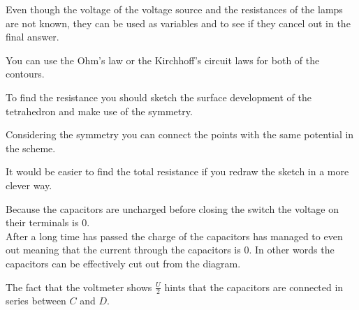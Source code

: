 \documentclass[11pt]{article}
\begin{document}
\hinteng
Even though the voltage of the voltage source and the resistances of the lamps are not known, they can be used as variables and to see if they cancel out in the final answer.
\probend
\bigskip


\hinteng
You can use the Ohm’s law or the Kirchhoff’s circuit laws for both of the contours.
\probend
\bigskip


\hinteng
To find the resistance you should sketch the surface development of the tetrahedron and make use of the symmetry.
\probend
\bigskip


\hinteng
Considering the symmetry you can connect the points with the same potential in the scheme.
\probend
\bigskip


\hinteng
It would be easier to find the total resistance if you redraw the sketch in a more clever way.
\probend
\bigskip


\hinteng
Because the capacitors are uncharged before closing the switch the voltage on their terminals is $0$.\\
After a long time has passed the charge of the capacitors has managed to even out meaning that the current through the capacitors is $0$. In other words the capacitors can be effectively cut out from the diagram.
\probend
\bigskip


\hinteng
The fact that the voltmeter shows $\frac{U}{2}$ hints that the capacitors are connected in series between $C$ and $D$.
\probend
\bigskip
\end{document}
